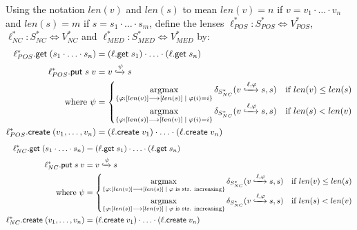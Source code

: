 \documentclass[acmsmall,review,anonymous]{acmart}\settopmatter{printfolios=true,printccs=false,printacmref=false}
\theoremstyle{definition}
\newcommand{\kw}[1]{\ensuremath{\mathsf{#1}}\xspace}
\newcommand{\get}{\ensuremath{\kw{get}}\xspace}
\newcommand{\pput}{\ensuremath{\kw{put}}\xspace}
\newcommand{\create}{\ensuremath{\kw{create}}\xspace}
\DeclareMathOperator*{\argmax}{argmax}
\begin{document}
Using the notation $len(v)$ and $len(s)$ to mean $len(v) = n$ if $v = v_1 \cdot \ldots \cdot v_n$ and $len(s) = m$ if $s = s_1 \cdot \ldots \cdot s_m$, define the lenses $\ell^*_{POS} : S^*_{POS} \Leftrightarrow V^*_{POS}$, $\ell^*_{NC} : S^*_{NC} \Leftrightarrow V^*_{NC}$ and $\ell^*_{MED} : S^*_{MED} \Leftrightarrow V^*_{MED}$ by:
\begin{align*}
\ell^*_{POS}.\get \; (s_1 \cdot  \ldots \cdot s_n) &= (\ell.\get \; s_1)
\cdot \ldots \cdot (\ell.\get \; s_n)\\
\ell^*_{POS}.\pput \; s \; v
&= v \xhookrightarrow{\psi} s\\
\text{where } \psi &= \begin{cases}
\argmax \limits_{\{\varphi : [len(v)] \longrightarrow [len(s)] \; | \; \varphi(i) = i\}} \delta_{S^*_{NC}}(v \xhookrightarrow{\ell, \varphi} s, s) & \text{if } len(v) \leq len(s)\\
\argmax \limits_{\{\varphi : [len(s)] \longrightarrow [len(v)] \; | \; \varphi(i) = i\}} \delta_{S^*_{NC}}(v \xhookrightarrow{\ell, \varphi} s, s) & \text{if } len(s) < len(v)
\end{cases}\\
\ell^*_{POS}.\create \; (v_1, \ldots, v_n) &= (\ell.\create \;
v_1) \cdot \ldots \cdot (\ell.\create \; v_n)
\end{align*}
\begin{align*}
\ell^*_{NC}.\get \; (s_1 \cdot  \ldots \cdot s_n) &= (\ell.\get \; s_1)
\cdot \ldots \cdot (\ell.\get \; s_n)\\
\ell^*_{NC}.\pput \; s \; v
&= v \xhookrightarrow{\psi} s\\
\text{where } \psi &= \begin{cases}
\argmax \limits_{\{\varphi : [len(v)] \longrightarrow [len(s)] \; | \; \varphi \text{ is str. increasing}\}} \delta_{S^*_{NC}}(v \xhookrightarrow{\ell, \varphi} s, s) & \text{if } len(v) \leq len(s)\\
\argmax \limits_{\{\varphi : [len(s)] \longrightarrow [len(v)] \; | \; \varphi \text{ is str. increasing}\}} \delta_{S^*_{NC}}(v \xhookrightarrow{\ell, \varphi} s, s) & \text{if } len(s) < len(v)
\end{cases}\\
\ell^*_{NC}.\create \; (v_1, \ldots, v_n) &= (\ell.\create \;
v_1) \cdot \ldots \cdot (\ell.\create \; v_n)
\end{align*}
\end{document}
